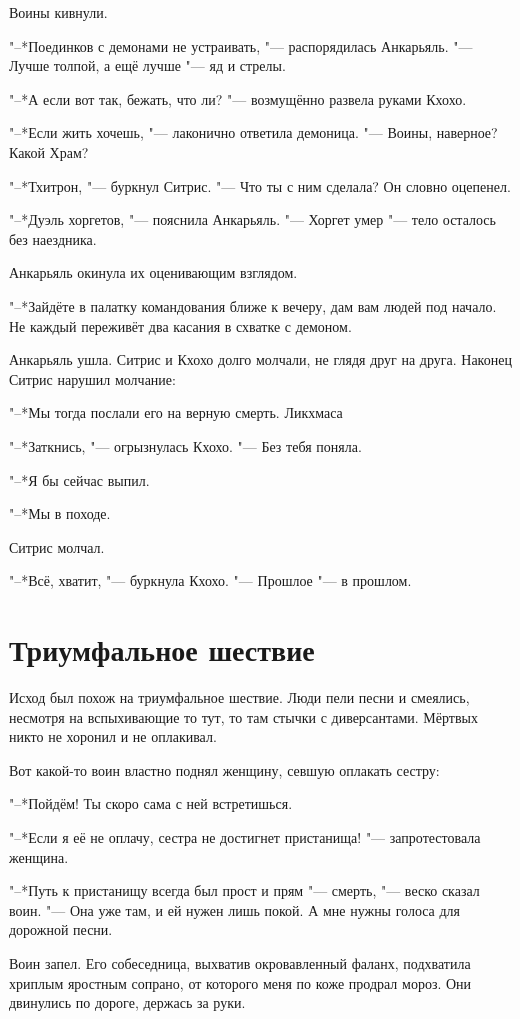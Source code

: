 \documentclass[a4paper,10pt]{book}
\newcommand{\ldotst}{\so{...}\xspace}
\begin{document}
Воины кивнули.

"--*Поединков с демонами не устраивать, "--- распорядилась Анкарьяль. "--- 
Лучше 
толпой, а ещё лучше "--- яд и стрелы.

"--*А если вот так, бежать, что ли? "--- возмущённо развела руками Кхохо.

"--*Если жить хочешь, "--- лаконично ответила демоница. "--- Воины, наверное? 
Какой Храм?

"--*Тхитрон, "--- буркнул Ситрис. "--- Что ты с ним сделала? Он словно оцепенел.

"--*Дуэль хоргетов, "--- пояснила Анкарьяль. "--- Хоргет умер "--- тело 
осталось 
без наездника.

Анкарьяль окинула их оценивающим взглядом.

"--*Зайдёте в палатку командования ближе к вечеру, дам вам людей под начало. Не 
каждый переживёт два касания в схватке с демоном.

Анкарьяль ушла. Ситрис и Кхохо долго молчали, не глядя друг на друга. Наконец
Ситрис нарушил молчание:

"--*Мы тогда послали его на верную смерть. Ликхмаса\ldotst

"--*Заткнись, "--- огрызнулась Кхохо. "--- Без тебя поняла.

"--*Я бы сейчас выпил.

"--*Мы в походе.

Ситрис молчал.

"--*Всё, хватит, "--- буркнула Кхохо. "--- Прошлое "--- в прошлом.

\section{Триумфальное шествие}

Исход был похож на триумфальное шествие. Люди пели песни и смеялись, несмотря 
на вспыхивающие то тут, то там стычки с диверсантами. Мёртвых никто не хоронил 
и не оплакивал.

Вот какой-то воин властно поднял женщину, севшую оплакать сестру:

"--*Пойдём! Ты скоро сама с ней встретишься.

"--*Если я её не оплачу, сестра не достигнет пристанища! "--- запротестовала 
женщина.

"--*Путь к пристанищу всегда был прост и прям "--- смерть, "--- веско сказал 
воин. "--- Она уже там, и ей нужен лишь покой. А мне нужны голоса для дорожной 
песни.

Воин запел. Его собеседница, выхватив окровавленный фаланх, подхватила хриплым 
яростным сопрано, от которого меня по коже продрал мороз. Они двинулись по 
дороге, держась за руки.
\end{document}
